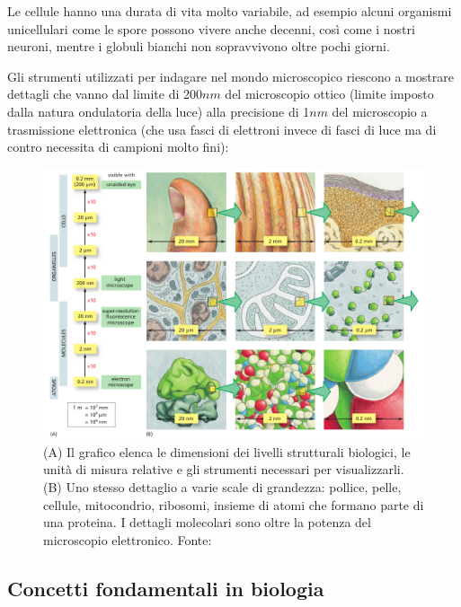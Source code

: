 \par Le cellule hanno una durata di vita molto variabile, ad esempio alcuni organismi unicellulari come le spore possono vivere anche decenni, così come i nostri neuroni, mentre i globuli bianchi non sopravvivono oltre pochi giorni. \\

\par Gli strumenti utilizzati per indagare nel mondo microscopico riescono a mostrare dettagli che vanno dal limite di 200$nm$ del microscopio ottico (limite imposto dalla natura ondulatoria della luce) alla precisione di 1$nm$ del microscopio a trasmissione elettronica (che usa fasci di elettroni invece di fasci di luce ma di contro necessita di campioni molto fini):

\begin{figure}[!h]
	\centering
	\includegraphics[scale=0.6]{images/grandezze.png}
	\caption{(A) Il grafico elenca le dimensioni dei livelli strutturali biologici, le unità di misura relative e gli strumenti necessari per visualizzarli. (B) Uno stesso dettaglio a varie scale di grandezza: pollice, pelle, cellule, mitocondrio, ribosomi, insieme di atomi che formano parte di una proteina. I dettagli molecolari sono oltre la potenza del microscopio elettronico. Fonte: \cite{alberts2018essential}}
	\label{fig:microscopi-grandezze}
\end{figure}

\subsection{Concetti fondamentali in biologia}


